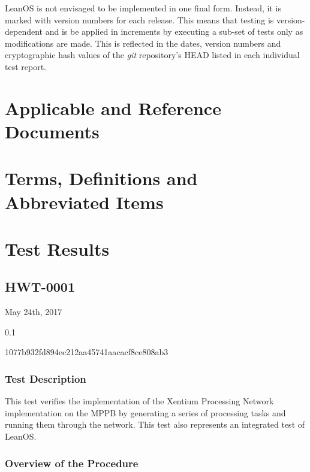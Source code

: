 LeanOS is not envisaged to be implemented in one final form. Instead, it is
marked with version numbers for each release. This means that testing is
version-dependent and is be applied in increments by executing a sub-set of
tests only as modifications are made. This is reflected in the dates, version
numbers and cryptographic hash values of the \emph{git} repository's {HEAD}
listed in each individual test report.

\chapter{Applicable and Reference Documents} %

\printbibliography[heading=none]


\chapter{Terms, Definitions and Abbreviated Items}
\printglossary[type=acronym]
\printglossary[type=main, style=altlist]


\chapter{Test Results}

\section{HWT-0001}

\begin{description}[labelwidth=4em,leftmargin=\parindent,labelindent=\parindent]
	\item[\textbf{Date}]	May 24th, 2017
	\item[\textbf{Version}]	0.1
	\item[\textbf{Hash}]	1077b932fd894ec212aa45741aacacf8ce808ab3
\end{description}

\subsection*{Test Description}

This test verifies the implementation of the \gls{Xentium} Processing Network
implementation on the \gls{MPPB} by generating a series of processing tasks and
running them through the network. This test also represents an integrated test
of LeanOS.

\subsection*{Overview of the Procedure}


